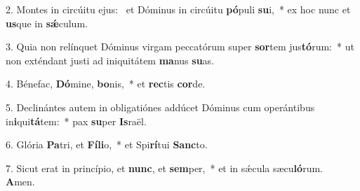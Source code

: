 2. Montes in circúitu ejus: \dag\  et Dóminus in circúitu \textbf{pó}puli \textbf{su}i,~*  ex hoc nunc et \textbf{us}que in \textbf{sǽ}culum.\

3. Quia non relínquet Dóminus virgam peccatórum super \textbf{sor}tem jus\textbf{tó}rum:~*  ut non exténdant justi ad iniquitátem \textbf{ma}nus \textbf{su}as.\

4. Bénefac, \textbf{Dó}mine, \textbf{bo}nis,~*  et \textbf{rec}tis \textbf{cor}de.\

5. Declinántes autem in obligatiónes addúcet Dóminus cum operántibus in\textbf{i}qui\textbf{tá}tem:~*  pax \textbf{su}per \textbf{Is}raël.\

6. Glória \textbf{Pa}tri, et \textbf{Fí}\textbf{li}o,~*  et Spi\textbf{rí}tui \textbf{Sanc}to.\

7. Sicut erat in princípio, et \textbf{nunc}, et \textbf{sem}per,~*  et in sǽcula sæcu\textbf{ló}rum. \textbf{A}men.\

